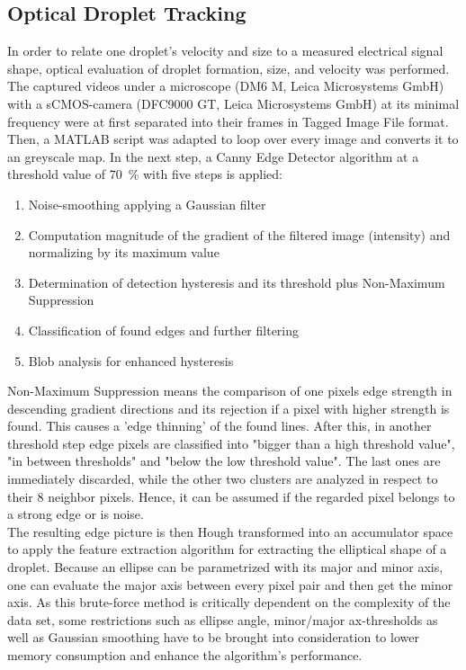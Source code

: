 \newpage
\subsection{Optical Droplet Tracking}
In order to relate one droplet's velocity and size to a measured electrical signal shape, optical evaluation of droplet formation, size, and velocity was performed. The captured videos under a microscope (DM6 M, Leica Microsystems GmbH) with a sCMOS-camera (DFC9000 GT, Leica Microsystems GmbH) at its minimal frequency were at first separated into their frames in Tagged Image File format. Then, a MATLAB script was adapted to loop over every image and converts it to an greyscale map. In the next step, a Canny Edge Detector algorithm at a threshold value of \SI{70}{\percent} with five steps is applied:\cite{lit:tracking:ellipse_detection}
\begin{enumerate}
	\item Noise-smoothing applying a Gaussian filter
	\item Computation magnitude of the gradient of the filtered image (intensity) and normalizing by its maximum value
	\item Determination of detection hysteresis and its threshold plus Non-Maximum Suppression
	\item Classification of found edges and further filtering
	\item Blob analysis for enhanced hysteresis
\end{enumerate}

Non-Maximum Suppression means the comparison of one pixels edge strength in descending gradient directions and its rejection if a pixel with higher strength is found. This causes a 'edge thinning' of the found lines. After this, in another threshold step edge pixels are classified into "bigger than a high threshold value", "in between thresholds" and "below the low threshold value". The last ones are immediately discarded, while the other two clusters are analyzed in respect to their 8 neighbor pixels. Hence, it can be assumed if the regarded pixel belongs to a strong edge or is noise.\\
The resulting edge picture is then Hough transformed into an accumulator space to apply the feature extraction algorithm for extracting the elliptical shape of a droplet. Because an ellipse can be parametrized with its major and minor axis, one can evaluate the major axis between every pixel pair and then get the minor axis.\cite{lit:tracking:ellipse_detection} As this brute-force method is critically dependent on the complexity of the data set, some restrictions such as ellipse angle, minor/major ax-thresholds as well as Gaussian smoothing have to be brought into consideration to lower memory consumption and enhance the algorithm's performance.


